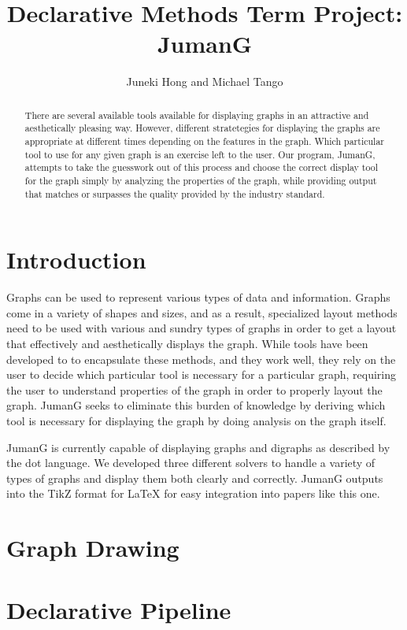 \documentclass{article}
\title{Declarative Methods Term Project: \\ JumanG}
\author{Juneki Hong and Michael Tango}
\date{}
\begin{document}
\maketitle

\begin{abstract}
There are several available tools available for displaying graphs in an attractive and aesthetically pleasing way. 
However, different stratetegies for displaying the graphs are appropriate at different times depending on the features in the graph. Which 
particular tool to use for any given graph is an exercise left to the user. Our program, JumanG, attempts to take the guesswork out of 
this process and choose the correct display tool for the graph simply by analyzing the properties of the graph, while providing output that 
matches or surpasses the quality provided by the industry standard.
\end{abstract}

\section{Introduction}
Graphs can be used to represent various types of data and information. Graphs come in a variety of shapes and sizes, and as a result, 
specialized layout methods need to be used with various and sundry types of graphs in order to get a layout that effectively and aesthetically 
displays the graph. While tools have been developed to to encapsulate these methods, and they work well, they rely on the user to decide which 
particular tool is necessary for a particular graph, requiring the user to understand properties of the graph in order to properly layout the
graph. JumanG seeks to eliminate this burden of knowledge by deriving which tool is necessary for displaying the graph by doing analysis on
the graph itself.

JumanG is currently capable of displaying graphs and digraphs as described by the dot language. We developed three different solvers to handle 
a variety of types of graphs and display them both clearly and correctly. JumanG outputs into the TikZ format for LaTeX for easy integration into 
papers like this one.
\section{Graph Drawing}


\section{Declarative Pipeline}
\end{document}
